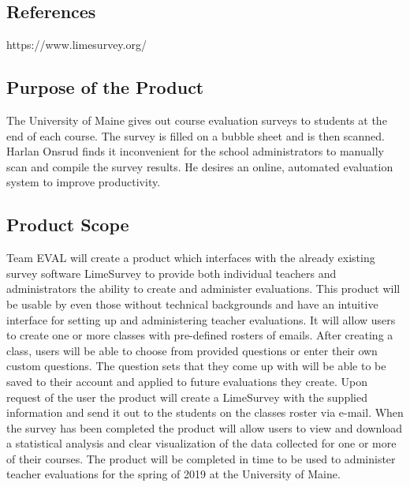 \documentclass{article}
\begin{document}
\subsection{References}

https://www.limesurvey.org/

\subsection{Purpose of the Product}

The University of Maine gives out course evaluation surveys to students at the end of each course. The survey is filled on a bubble sheet and is then scanned. Harlan Onsrud finds it inconvenient for the school administrators to manually scan and compile the survey results. He desires an online, automated evaluation system to improve productivity.\par

\subsection{Product Scope}

Team EVAL will create a product which interfaces with the already existing survey software LimeSurvey to provide both individual teachers and administrators the ability to create and administer evaluations.  This product will be usable by even those without technical backgrounds and have an intuitive interface for setting up and administering teacher evaluations.  It will allow users to create one or more classes with pre-defined rosters of emails.   After creating a class, users will be able to choose from provided questions or enter their own custom questions.  The question sets that they come up with will be able to be saved to their account and applied to future evaluations they create.  Upon request of the user the product will create a LimeSurvey with the supplied information and send it out to the students on the classes roster via e-mail.  When the survey has been completed the product will allow users to view and download a statistical analysis and clear visualization of the data collected for one or more of their courses.  The product will be completed in time to be used to administer teacher evaluations for the spring of 2019 at the University of Maine.\par
\end{document}
